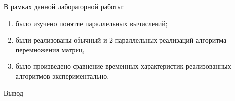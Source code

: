 \documentclass[12pt]{report}
\begin{document}
В рамках данной лабораторной работы:

\begin{enumerate}
	\item было изучено понятие параллельных вычислений;

	\item были реализованы обычный и  2 параллельных реализаций алгоритма перемножения матриц;

	\item было произведено сравнение временных характеристик реализованных алгоритмов экспериментально.
\end{enumerate}

Вывод




\end{document}
